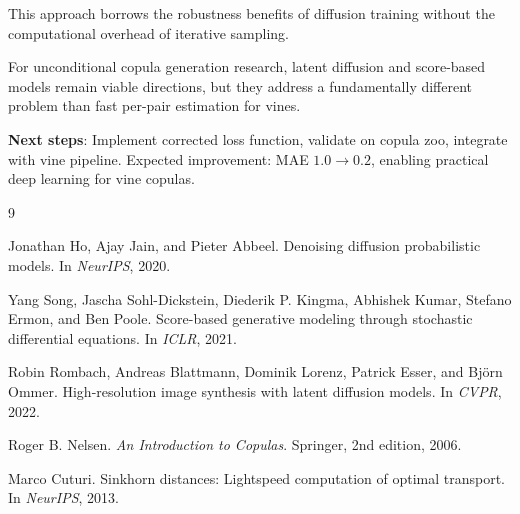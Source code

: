\documentclass[11pt]{article}
\begin{document}
This approach borrows the robustness benefits of diffusion training without the computational overhead of iterative sampling.

For unconditional copula generation research, latent diffusion and score-based models remain viable directions, but they address a fundamentally different problem than fast per-pair estimation for vines.

\textbf{Next steps}: Implement corrected loss function, validate on copula zoo, integrate with vine pipeline. Expected improvement: MAE $1.0 \to 0.2$, enabling practical deep learning for vine copulas.


\begin{thebibliography}{9}

Jonathan Ho, Ajay Jain, and Pieter Abbeel.
\newblock Denoising diffusion probabilistic models.
\newblock In \emph{NeurIPS}, 2020.

Yang Song, Jascha Sohl-Dickstein, Diederik P. Kingma, Abhishek Kumar, Stefano Ermon, and Ben Poole.
\newblock Score-based generative modeling through stochastic differential equations.
\newblock In \emph{ICLR}, 2021.

Robin Rombach, Andreas Blattmann, Dominik Lorenz, Patrick Esser, and Björn Ommer.
\newblock High-resolution image synthesis with latent diffusion models.
\newblock In \emph{CVPR}, 2022.

Roger B. Nelsen.
\newblock \emph{An Introduction to Copulas}.
\newblock Springer, 2nd edition, 2006.

Marco Cuturi.
\newblock Sinkhorn distances: Lightspeed computation of optimal transport.
\newblock In \emph{NeurIPS}, 2013.

\end{thebibliography}
\end{document}
